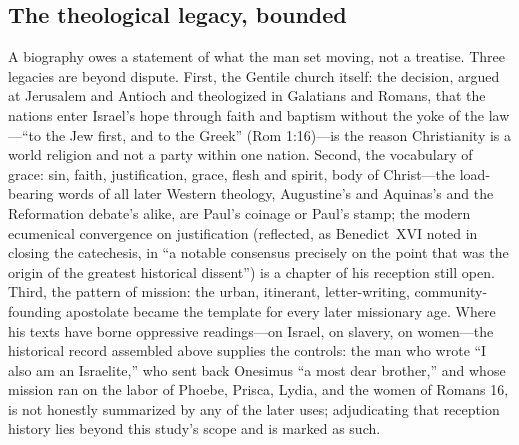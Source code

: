 \subsection{The theological legacy, bounded}

A biography owes a statement of what the man set moving, not a treatise.
Three legacies are beyond dispute. First, the Gentile church itself: the
decision, argued at Jerusalem and Antioch and theologized in Galatians
and Romans, that the nations enter Israel's hope through faith and
baptism without the yoke of the law---``to the Jew first, and to the
Greek'' (Rom 1:16)---is the reason Christianity is a world religion and
not a party within one nation. Second, the vocabulary of grace: sin,
faith, justification, grace, flesh and spirit, body of Christ---the
load-bearing words of all later Western theology, Augustine's and
Aquinas's and the Reformation debate's alike, are Paul's coinage or
Paul's stamp; the modern ecumenical convergence on justification
(reflected, as Benedict~XVI noted in closing the catechesis, in ``a
notable consensus precisely on the point that was the origin of the
greatest historical dissent'') is a chapter of his reception still open.
Third, the pattern of mission: the urban, itinerant, letter-writing,
community-founding apostolate became the template for every later
missionary age. Where his texts have borne oppressive readings---on
Israel, on slavery, on women---the historical record assembled above
supplies the controls: the man who wrote ``I also am an Israelite,'' who
sent back Onesimus ``a most dear brother,'' and whose mission ran on the
labor of Phoebe, Prisca, Lydia, and the women of Romans 16, is not
honestly summarized by any of the later uses; adjudicating that reception
history lies beyond this study's scope and is marked as such.
